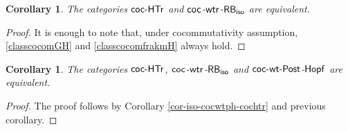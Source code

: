 \documentclass[10pt,a4paper]{amsart}
\numberwithin{equation}{section}
\newtheorem{Corollary}[Theorem]{Corollary}
\begin{document}
\begin{Corollary}
The categories ${\sf coc}\textnormal{-}{\sf HTr}$ and ${\sf coc}$-${\sf wtr}$-${\sf RB}_{{\sf iso}}$ are equivalent.
\end{Corollary}
\begin{proof}
It is enough to note that, under cocommutativity assumption, \eqref{classcocomGH} and \eqref{classcocomfrakmH} always hold.
\end{proof}

\begin{Corollary}
The categories ${\sf coc}\textnormal{-}{\sf HTr}$, ${\sf coc}$-${\sf wtr}$-${\sf RB}_{{\sf iso}}$ and $\sf{coc}\textnormal{-}{\sf wt}\textnormal{-}{\sf Post}$-$\sf{Hopf}$ are equivalent.
\end{Corollary}
\begin{proof}
The proof follows by Corollary \ref{cor-iso-cocwtph-cochtr} and previous corollary.
\end{proof}
\end{document}
